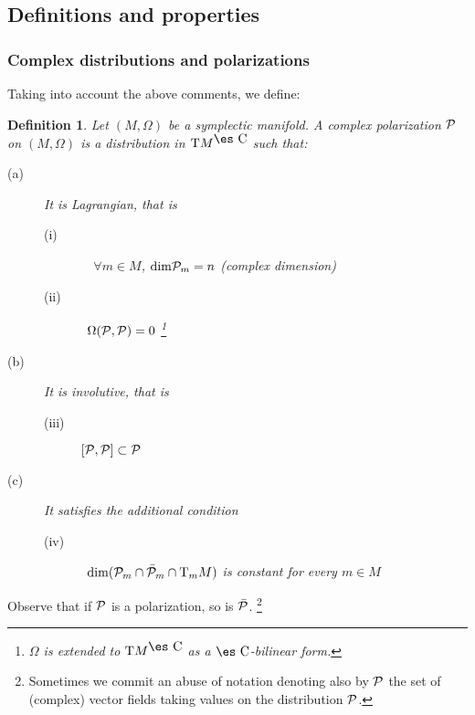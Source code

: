 \documentclass[12pt]{article}
\theoremstyle{plain}
\newtheorem{definition}{Definition}
\def\P{{\cal P}}
\def\Complex{\mbox{\es C}}
\def\Tan{{\rm T}}
\begin{document}
\subsection{Definitions and properties}


\subsubsection{Complex distributions and polarizations}


Taking into account the above comments,
we define:

\begin{definition}
Let $(M,\Omega )$ be a symplectic manifold.
A {\rm complex polarization} $\P$
on $(M,\Omega )$ is a distribution in $\Tan M^{\Complex}$
such that:
\begin{description}
\item[{\rm (a)}]
It is {\it Lagrangian}, that is
\begin{description}
\item[{\rm (i)}]\ \
$\forall m \in M$,
${\rm dim} \P_m = n$ (complex dimension)
\item[{\rm (ii)}]\
$\Omega (\P ,\P ) = 0$ \footnote{ $\Omega$ is extended to $\Tan
M^{\Complex}$ as a $\Complex$-bilinear form.}
\end{description}
\item[{\rm (b)}]
It is {\it involutive}, that is
\begin{description}
\item[{\rm (iii)}]
$[\P ,\P ] \subset \P$
\end{description}
\item[{\rm (c)}]
It satisfies the additional condition
\begin{description}
\item[{\rm (iv)}]\
$\dim (\P_m \cap \bar \P_m \cap \Tan_m M)$
is constant for every $m \in M$
\end{description}
\end{description}
\label{pol}
\end{definition}

Observe that if $\P$ is a polarization,
so is $\bar \P$.%
\footnote{
Sometimes we commit an abuse of notation
denoting also by $\P$ the set of (complex) vector fields
taking values on the distribution $\P$.}
\end{document}
